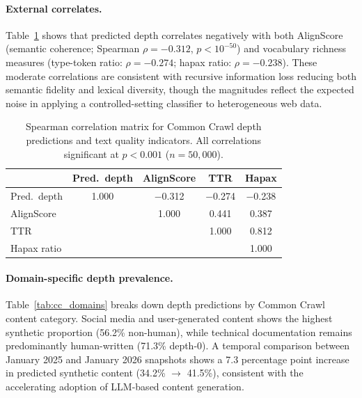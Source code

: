 \documentclass[11pt,a4paper]{article}
\begin{document}
\paragraph{External correlates.}
Table~\ref{tab:cc_correlations} shows that predicted depth correlates negatively with both AlignScore (semantic coherence; Spearman $\rho = -0.312$, $p < 10^{-50}$) and vocabulary richness measures (type-token ratio: $\rho = -0.274$; hapax ratio: $\rho = -0.238$).
These moderate correlations are consistent with recursive information loss reducing both semantic fidelity and lexical diversity, though the magnitudes reflect the expected noise in applying a controlled-setting classifier to heterogeneous web data.

\begin{table}[t]
\centering
\caption{Spearman correlation matrix for Common Crawl depth predictions and text quality indicators. All correlations significant at $p < 0.001$ ($n = 50{,}000$).}
\label{tab:cc_correlations}
\small
\begin{tabular}{lcccc}
\toprule
 & \textbf{Pred.\ depth} & \textbf{AlignScore} & \textbf{TTR} & \textbf{Hapax} \\
\midrule
Pred.\ depth & 1.000 & $-$0.312 & $-$0.274 & $-$0.238 \\
AlignScore   &       &  1.000   &  0.441   &  0.387   \\
TTR          &       &          &  1.000   &  0.812   \\
Hapax ratio  &       &          &          &  1.000   \\
\bottomrule
\end{tabular}
\end{table}

\paragraph{Domain-specific depth prevalence.}
Table~\ref{tab:cc_domains} breaks down depth predictions by Common Crawl content category.
Social media and user-generated content shows the highest synthetic proportion (56.2\% non-human), while technical documentation remains predominantly human-written (71.3\% depth-0).
A temporal comparison between January 2025 and January 2026 snapshots shows a 7.3 percentage point increase in predicted synthetic content (34.2\% $\to$ 41.5\%), consistent with the accelerating adoption of LLM-based content generation.
\end{document}
